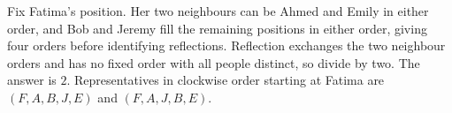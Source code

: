 Fix Fatima's position. Her two neighbours can be Ahmed and Emily in either order, and Bob and Jeremy fill the remaining positions in either order, giving four orders before identifying reflections. Reflection exchanges the two neighbour orders and has no fixed order with all people distinct, so divide by two. The answer is $\boxed2$. Representatives in clockwise order starting at Fatima are $(F,A,B,J,E)$ and $(F,A,J,B,E)$.
